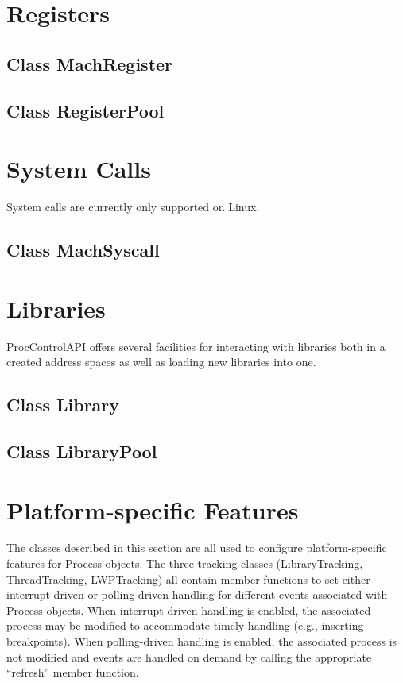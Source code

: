 \documentclass{article}
\begin{document}
\section{Registers}

  \subsection{Class MachRegister}
    

  \subsection{Class RegisterPool}
    

\section{System Calls}

  System calls are currently only supported on Linux.

  \subsection{Class MachSyscall}
    

\section{Libraries}
  ProcControlAPI offers several facilities for interacting with libraries
  both in a created address spaces as well as loading new libraries into one.

  \subsection{Class Library}
    

  \subsection{Class LibraryPool}
    

\section{Platform-specific Features}
  The classes described in this section are all used to configure
  platform-specific features for Process objects. The three tracking classes
  (LibraryTracking, ThreadTracking, LWPTracking) all contain member functions to
  set either interrupt-driven or polling-driven handling for different events
  associated with Process objects. When interrupt-driven handling is enabled,
  the associated process may be modified to accommodate timely handling (e.g.,
  inserting breakpoints). When polling-driven handling is enabled, the
  associated process is not modified and events are handled on demand by calling
  the appropriate ``refresh'' member function.
\end{document}

